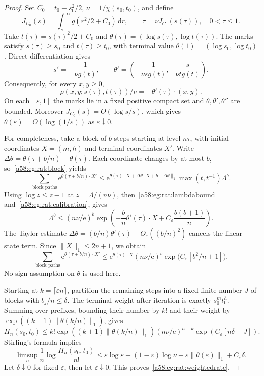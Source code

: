\documentclass[11pt,letterpaper]{article}
\theoremstyle{remark}
\newcommand{\egdd}{\,\mathrm d}
\newcommand{\ee}{\mathrm e}
\begin{document}
\begin{proof}
Set $C_0=t_0-s_0^2/2$, $\nu=1/\chi(s_0,t_0)$, and define
\[
 J_{C_0}(s)=\int_s^\infty g(r^2/2+C_0)\egdd r,
 \qquad \tau=\nu J_{C_0}(s(\tau)),\quad 0<\tau\le1.
\]
Take $t(\tau)=s(\tau)^2/2+C_0$ and
$\theta(\tau)=(\log s(\tau),\log t(\tau))$.
The marks satisfy $s(\tau)\ge s_0$ and $t(\tau)\ge t_0$, with terminal value
$\theta(1)=(\log s_0,\log t_0)$. Direct differentiation gives
\[
 s'=-\frac1{\nu g(t)},\qquad
 \theta'=\left(-\frac1{\nu s g(t)},-\frac{s}{\nu t g(t)}\right).
\]
Consequently, for every $x,y\ge0$,
\begin{equation}\label{a58:eg:rat:calibration}
 \rho(x,y;s(\tau),t(\tau))/\nu=-\theta'(\tau)\mathbin{\cdot}(x,y).
\end{equation}
On each $[\varepsilon,1]$ the marks lie in a fixed positive compact set and $\theta,\theta',\theta''$ are bounded. Moreover $J_{C_0}(s)=O(\log s/s)$, which gives $\theta(\varepsilon)=O(\log(1/\varepsilon))$ as $\varepsilon\downarrow0$.

For completeness, take a block of $b$ steps starting at level $n\tau$, with initial coordinates $X=(m,h)$ and terminal coordinates $X'$. Write
$\Delta\theta=\theta(\tau+b/n)-\theta(\tau)$. Each coordinate changes by at most $b$, so~\eqref{a58:eg:rat:block} yields
\[
 \sum_{\text{block paths}}\ee^{\theta(\tau+b/n)\cdot X'}
 \le \ee^{\theta(\tau)\cdot X+\Delta\theta\cdot X+b\|\Delta\theta\|_1}
       \max(t,t^{-1})\Lambda^b.
\]
Using $\log z\le z-1$ at $z=\Lambda/(n\nu)$, then~\eqref{a58:eg:rat:lambdabound} and~\eqref{a58:eg:rat:calibration}, gives
\[
 \Lambda^b\le(n\nu/\ee)^b
 \exp\left(-\frac bn\theta'(\tau)\cdot X
             +C_\varepsilon\frac{b(b+1)}n\right).
\]
The Taylor estimate
$\Delta\theta=(b/n)\theta'(\tau)+O_\varepsilon((b/n)^2)$ cancels the linear state term. Since $\|X\|_1\le2n+1$, we obtain
\begin{equation}\label{a58:eg:rat:oneblock}
 \sum_{\text{block paths}}\ee^{\theta(\tau+b/n)\cdot X'}
 \le\ee^{\theta(\tau)\cdot X}(n\nu/\ee)^b
       \exp\bigl(C_\varepsilon[b^2/n+1]\bigr).
\end{equation}
No sign assumption on $\theta$ is used here.

Starting at $k=\lceil\varepsilon n\rceil$, partition the remaining steps into a fixed finite number $J$ of blocks with $b_j/n\le\delta$. The terminal weight after iteration is exactly $s_0^m t_0^h$. Summing over prefixes, bounding their number by $k!$ and their weight by $\exp((k+1)\|\theta(k/n)\|_1)$, gives
\[
 H_n(s_0,t_0)\le
 k!\exp((k+1)\|\theta(k/n)\|_1)
 (n\nu/\ee)^{n-k}\exp(C_\varepsilon[n\delta+J]).
\]
Stirling's formula implies
\[
 \limsup_n\frac1n\log\frac{H_n(s_0,t_0)}{n!}
 \le\varepsilon\log\varepsilon+(1-\varepsilon)\log\nu
      +\varepsilon\|\theta(\varepsilon)\|_1+C_\varepsilon\delta.
\]
Let $\delta\downarrow0$ for fixed $\varepsilon$, then let $\varepsilon\downarrow0$. This proves~\eqref{a58:eg:rat:weightedrate}.
\end{proof}
\end{document}
